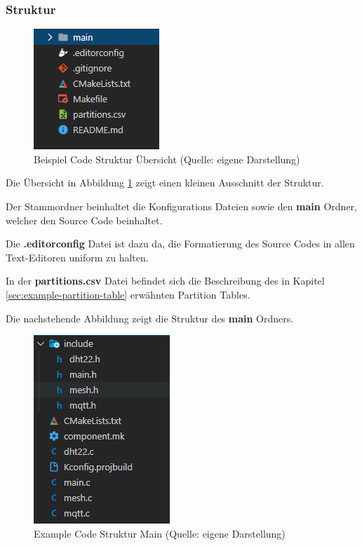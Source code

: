 \subsubsection{Struktur}

\begin{figure}[H]
    \begin{center}
        \includegraphics[scale=0.8]{images/example_code_structure_overview.png}
        \caption{Beispiel Code Struktur Übersicht (Quelle: eigene Darstellung)}
        \label{abb:example_code_structure_overview}
    \end{center}
\end{figure}

Die Übersicht in Abbildung \ref{abb:example_code_structure_overview} zeigt einen kleinen Ausschnitt der Struktur.

Der Stammordner beinhaltet die Konfigurations Dateien sowie den \textbf{main} Ordner, welcher den Source Code beinhaltet.

Die \textbf{.editorconfig} Datei ist dazu da, die Formatierung des Source Codes in allen Text-Editoren uniform zu halten.

In der \textbf{partitions.csv} Datei befindet sich die Beschreibung des in Kapitel \ref{sec:example-partition-table} erwähnten Partition Tables.

Die nachstehende Abbildung zeigt die Struktur des \textbf{main} Ordners.

\begin{figure}[H]
    \begin{center}
        \includegraphics[scale=0.8]{images/example_code_structure_main.png}
        \caption{Example Code Struktur Main (Quelle: eigene Darstellung)}
        \label{abb:example_code_structure_main}
    \end{center}
\end{figure}

